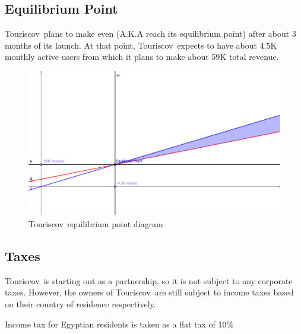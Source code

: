 \documentclass[12pt]{article}
\newcommand{\tco}{Touriscov}
\begin{document}
\subsection{Equilibrium Point}

\tco\ plans to make even (A.K.A reach its equilibrium point) after about 3 months of its launch. At that point, \tco\ expects to have about 4.5K monthly active users from which it plans to make about 59K total revenue.\ \par

\vspace{2em}

\begin{figure}[h]
    \centering
    \includegraphics[scale=0.42]{equilibriumPoint.pdf}
    \caption{\tco\ equilibrium point diagram}
    \label{fig:my_label} %
\end{figure}

\subsection{Taxes}
\tco\ is starting out as a partnership, so it is not subject to any corporate taxes. However, the owners of \tco\ are still subject to income taxes based on their country of residence respectively.\par

\noindent
Income tax for Egyptian residents is taken as a flat tax of 10\%

\hfill
\end{document}
